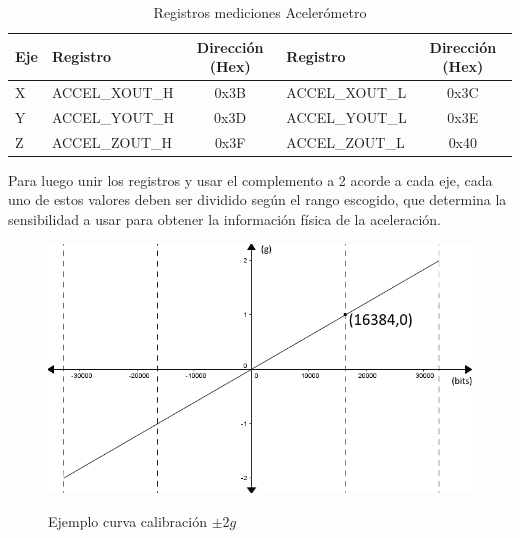 \documentclass[12pt,a4paper]{article}
\begin{document}
\begin{itemize}
				\begin{table}[H]
					\centering
					\label{table:registrosaccel}
					\begin{tabular}{|l|l|c|l|c|}
						\hline
						\textbf{Eje} & \textbf{Registro} & \textbf{Dirección (Hex)} & \textbf{Registro} & \textbf{Dirección (Hex)} \\ \hline
						X            & ACCEL\_XOUT\_H     & 0x3B                     & ACCEL\_XOUT\_L     & 0x3C                     \\ \hline
						Y            & ACCEL\_YOUT\_H     & 0x3D                     & ACCEL\_YOUT\_L     & 0x3E                     \\ \hline
						Z            & ACCEL\_ZOUT\_H     & 0x3F                     & ACCEL\_ZOUT\_L     & 0x40                     \\ \hline
					\end{tabular}
					\caption{Registros mediciones Acelerómetro}					
				\end{table}				
								
				Para luego unir los registros y usar el complemento a 2 acorde a cada eje, cada uno de estos valores deben ser dividido según el rango escogido, que determina la sensibilidad a usar para obtener la información física de la aceleración.
				
				\begin{figure}[H]
					\centering
					\includegraphics[scale=0.6]{images/curvacalibracion}
					\label{fig:curvacalibracion}
					\caption{Ejemplo curva calibración $\pm 2g$}
				\end{figure}
				
			\end{itemize}
			
\end{document}
